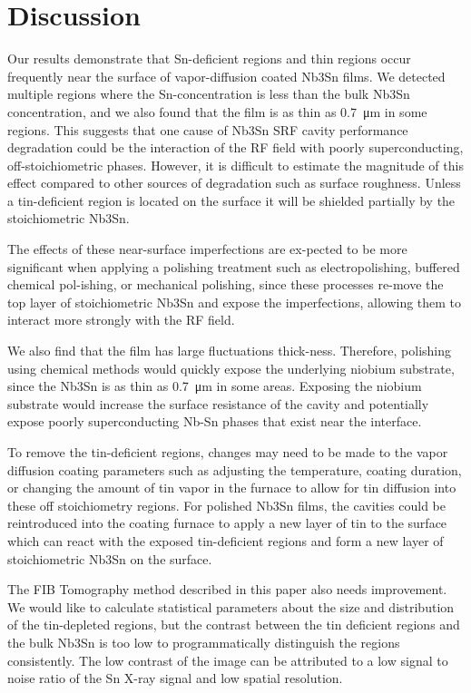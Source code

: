  
\section{Discussion}

Our results demonstrate that Sn-deficient regions and thin regions occur frequently near the surface of vapor-diffusion coated Nb3Sn films. We detected multiple regions where the Sn-concentration is less than the bulk Nb3Sn concentration, and we also found that the film is as thin as \qty{0.7}{\micro\meter} in some regions. This suggests that one cause of Nb3Sn SRF cavity performance degradation could be the interaction of the RF field with poorly superconducting, off-stoichiometric phases. However, it is difficult to estimate the magnitude of this effect compared to other sources of degradation such as surface roughness. Unless a tin-deficient region is located on the surface it will be shielded partially by the stoichiometric Nb3Sn. 

The effects of these near-surface imperfections are ex-pected to be more significant when applying a polishing treatment such as electropolishing, buffered chemical pol-ishing, or mechanical polishing, since these processes re-move the top layer of stoichiometric Nb3Sn and expose the imperfections, allowing them to interact more strongly with the RF field. 

We also find that the film has large fluctuations thick-ness. Therefore, polishing using chemical methods would quickly expose the underlying niobium substrate, since the Nb3Sn is as thin as \qty{0.7}{\micro\meter} in some areas. Exposing the niobium substrate would increase the surface resistance of the cavity and potentially expose poorly superconducting Nb-Sn phases that exist near the interface\cite{lee2018atomic}.

To remove the tin-deficient regions, changes may need to be made to the vapor diffusion coating parameters such as adjusting the temperature, coating duration, or changing the amount of tin vapor in the furnace to allow for tin diffusion into these off stoichiometry regions. For polished Nb3Sn films, the cavities could be reintroduced into the coating furnace to apply a new layer of tin to the surface which can react with the exposed tin-deficient regions and form a new layer of stoichiometric Nb3Sn on the surface.

The FIB Tomography method described in this paper also needs improvement. We would like to calculate statistical parameters about the size and distribution of the tin-depleted regions, but the contrast between the tin deficient regions and the bulk Nb3Sn is too low to programmatically distinguish the regions consistently. The low contrast of the image can be attributed to a low signal to noise ratio of the Sn X-ray signal and low spatial resolution.

